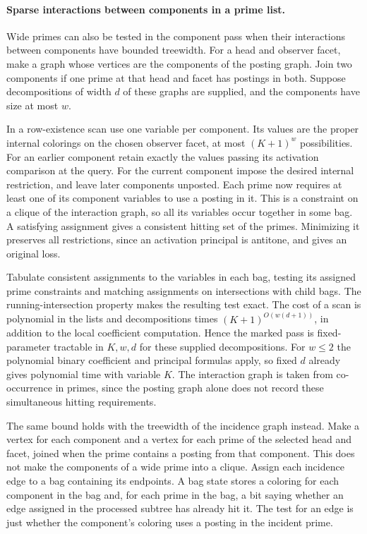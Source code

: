 \paragraph{Sparse interactions between components in a prime list.}
Wide primes can also be tested in the component pass
when their interactions between components have bounded
treewidth. For a head and observer facet, make a graph
whose vertices are the components of the posting graph.
Join two components if one prime at that head and facet
has postings in both. Suppose decompositions of width
$d$ of these graphs are supplied, and the components
have size at most $w$.

In a row-existence scan use one variable per component.
Its values are the proper internal colorings on the
chosen observer facet, at most $(K+1)^w$ possibilities.
For an earlier component retain exactly the values
passing its activation comparison at the query. For
the current component impose the desired internal
restriction, and leave later components unposted.
Each prime now requires at least one of its component
variables to use a posting in it. This is a constraint
on a clique of the interaction graph, so all its
variables occur together in some bag. A satisfying
assignment gives a consistent hitting set of the
primes. Minimizing it preserves all restrictions,
since an activation principal is antitone, and
gives an original loss.

Tabulate consistent assignments to the variables in
each bag, testing its assigned prime constraints and
matching assignments on intersections with child bags.
The running-intersection property makes the resulting
test exact. The cost of a scan is polynomial in the
lists and decompositions times $(K+1)^{O(w(d+1))}$,
in addition to the local coefficient computation.
Hence the marked pass is fixed-parameter tractable in
$K,w,d$ for these supplied decompositions. For $w\le2$
the polynomial binary coefficient and principal
formulas apply, so fixed $d$ already gives polynomial
time with variable $K$. The interaction graph is taken
from co-occurrence in primes, since the posting graph
alone does not record these simultaneous hitting
requirements.

The same bound holds with the treewidth of the
incidence graph instead. Make a vertex for each
component and a vertex for each prime of the
selected head and facet, joined when the prime
contains a posting from that component. This
does not make the components of a wide prime
into a clique. Assign each incidence edge to a
bag containing its endpoints. A bag state stores
a coloring for each component in the bag and,
for each prime in the bag, a bit saying whether
an edge assigned in the processed subtree has
already hit it. The test for an edge is just
whether the component's coloring uses a posting
in the incident prime.

